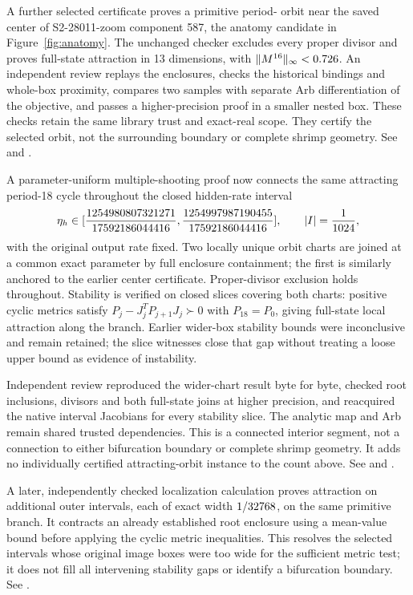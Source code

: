 \documentclass[11pt,letterpaper]{article}
\begin{document}
A further selected certificate proves a primitive period-\nPEighteenPeriod{} orbit near the saved center
of S2-28011-zoom component 587, the anatomy candidate in Figure~\ref{fig:anatomy}. The unchanged checker
excludes every proper divisor and proves full-state attraction in 13 dimensions, with
$\|M^{16}\|_\infty<0.726$.
An independent review replays the enclosures, checks the historical bindings and whole-box proximity,
compares two samples with separate Arb differentiation of the objective, and passes a higher-precision proof
in a smaller nested box. These checks retain the same library trust and exact-real scope. They certify the
selected orbit, not the surrounding boundary or complete shrimp geometry. See
 and .

A parameter-uniform multiple-shooting proof now connects the same attracting period-18 cycle
throughout the closed hidden-rate interval
\begin{equation}
\eta_h\in[\frac{1254980807321271}{17592186044416}, \frac{1254997987190455}{17592186044416}],\qquad |I|=\frac{1}{1024},
\end{equation}
with the original output rate fixed. Two locally unique orbit charts are joined at a common exact
parameter by full enclosure containment; the first is similarly anchored to the earlier center
certificate. Proper-divisor exclusion holds throughout. Stability is verified on
\nConnectedSlices{} closed slices covering both charts: positive cyclic metrics satisfy
$P_j-J_j^TP_{j+1}J_j\succ0$ with $P_{18}=P_0$, giving full-state local attraction along the branch.
Earlier wider-box stability bounds were inconclusive and remain retained; the slice witnesses close
that gap without treating a loose upper bound as evidence of instability.

Independent review reproduced the wider-chart result byte for byte, checked root inclusions,
divisors and both full-state joins at higher precision, and reacquired the native interval Jacobians
for every stability slice. The analytic map and Arb remain shared trusted dependencies.
This is a connected interior segment, not a connection to either bifurcation boundary or complete
shrimp geometry. It adds no individually certified attracting-orbit instance to the count above.
See  and
.

A later, independently checked localization calculation proves attraction on
\nLocalizedIntervals{} additional outer intervals, each of exact width
$1/32768$, on the same primitive branch. It contracts an already
established root enclosure using a mean-value bound before applying the cyclic
metric inequalities. This resolves the selected intervals whose original image
boxes were too wide for the sufficient metric test; it does not fill all intervening
stability gaps or identify a bifurcation boundary. See
.
\end{document}
